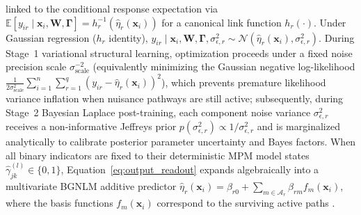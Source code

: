 \documentclass[11pt,a4paper]{article}
\begin{document}
linked to the conditional response expectation via $\mathbb{E}[y_{ir} \mid \bm{x}_i, \bm{W}, \bm{\Gamma}] = h_r^{-1}(\hat{\eta}_r(\bm{x}_i))$ for a canonical link function $h_r(\cdot)$. Under Gaussian regression ($h_r$ identity), $y_{ir} \mid \bm{x}_i, \bm{W}, \bm{\Gamma}, \sigma_{\epsilon,r}^2 \sim \mathcal{N}(\hat{\eta}_r(\bm{x}_i), \sigma_{\epsilon,r}^2)$. During Stage~1 variational structural learning, optimization proceeds under a fixed noise precision scale $\sigma_{\text{scale}}^{-2}$ (equivalently minimizing the Gaussian negative log-likelihood $\frac{1}{2\sigma_{\text{scale}}^2}\sum_{i=1}^n \sum_{r=1}^q (y_{ir} - \hat{\eta}_r(\bm{x}_i))^2$), which prevents premature likelihood variance inflation when nuisance pathways are still active; subsequently, during Stage~2 Bayesian Laplace post-training, each component noise variance $\sigma_{\epsilon,r}^2$ receives a non-informative Jeffreys prior $p(\sigma_{\epsilon,r}^2) \propto 1/\sigma_{\epsilon,r}^2$ and is marginalized analytically to calibrate posterior parameter uncertainty and Bayes factors. When all binary indicators are fixed to their deterministic MPM model states $\hat{\gamma}_{jk}^{(l)} \in \{0, 1\}$, Equation~\eqref{eq:output_readout} expands algebraically into a multivariate BGNLM additive predictor $\hat{\eta}_r(\bm{x}_i) = \beta_{r0} + \sum_{m \in \mathcal{A}_r} \beta_{rm} f_m(\bm{x}_i)$, where the basis functions $f_m(\bm{x}_i)$ correspond to the surviving active paths \citep{hubin2024sparse, skaaret2024input}.
\end{document}
